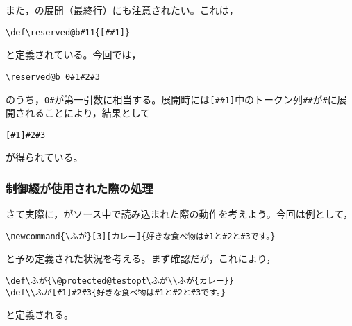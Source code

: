 \documentclass[autodetect-engine,dvipdfmx]{jsarticle}
\begin{document}
また，の展開（最終行）にも注意されたい。これは，
\begin{lstlisting}
\def\reserved@b#11{[##1]}
\end{lstlisting}
と定義されている。今回では，
\begin{lstlisting}
\reserved@b 0#1#2#3
\end{lstlisting}
のうち，\preSub\verb|0#|\preSub が第一引数に相当する。展開時には\preSub\verb|[##1]|\preSub 中のトークン列\preSub\verb|##|\preSub が\preSub\verb|#|\preSub に展開されることにより，結果として
\begin{lstlisting}
[#1]#2#3
\end{lstlisting}
が得られている。

\subsubsection{制御綴が使用された際の処理}

さて実際に，がソース中で読み込まれた際の動作を考えよう。今回は例として，
\begin{lstlisting}
\newcommand{\ふが}[3][カレー]{好きな食べ物は#1と#2と#3です。}
\end{lstlisting}
と予め定義された状況を考える。まず確認だが，これにより，
\begin{lstlisting}
\def\ふが{\@protected@testopt\ふが\\ふが{カレー}}
\def\\ふが[#1]#2#3{好きな食べ物は#1と#2と#3です。}
\end{lstlisting}
と定義される。
\end{document}
